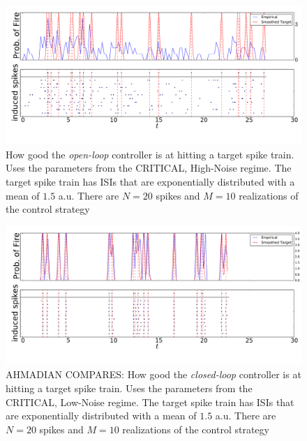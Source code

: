 \documentclass[12pt]{iopart}
\begin{document}
\begin{figure}[htp]
\begin{center}
  \includegraphics[width=.99\textwidth]{Figs/TrainController/CRITHN_ol_trains_sim_10.pdf}
  \caption[ ]{How good the {\sl open-loop} controller is at hitting a target
  spike train. Uses the parameters from the CRITICAL, High-Noise regime. The
  target spike train has ISIs that are exponentially distributed with a
  mean of $1.5$ a.u. There are $N=20$ spikes and $M=10$ realizations of the
  control strategy}
  \label{fig:targettrain_ol_critlownoise}
\end{center}
\end{figure}
\begin{figure}[htp]
\begin{center}
  \includegraphics[width=.99\textwidth]{Figs/TrainController/CRITLN_Ahmadian_cl_trains_sim_10.pdf}
  \caption[ ]{AHMADIAN COMPARES: How good the {\sl closed-loop} controller is at
  hitting a target spike train. Uses the parameters from the CRITICAL, Low-Noise
  regime. The target spike train has ISIs that are exponentially distributed with a
  mean of $1.5$ a.u. There are $N=20$ spikes and $M=10$ realizations of the
  control strategy}
  \label{fig:targettrain_cl_critlownoise}
\end{center}
\end{figure}
\end{document}
